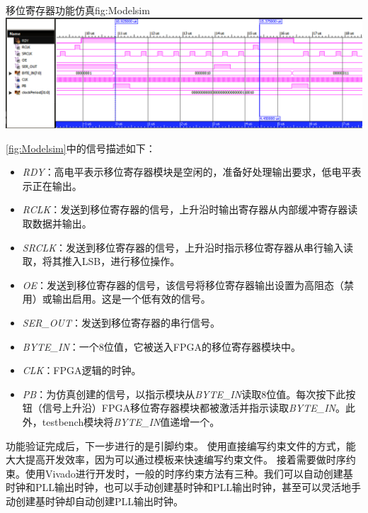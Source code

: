 \documentclass[supercite]{HustGraduPaper}
\begin{document}
\begin{generalfig}[htb]{移位寄存器功能仿真}{fig:Modelsim}
	\includegraphics[width=\linewidth]{Figures/Modelsim.png}
\end{generalfig}	

\autoref{fig:Modelsim}中的信号描述如下：
\begin{itemize}
	\item {\itshape RDY}：高电平表示移位寄存器模块是空闲的，准备好处理输出要求，低电平表示正在输出。
	\item {\itshape RCLK}：发送到移位寄存器的信号，上升沿时输出寄存器从内部缓冲寄存器读取数据并输出。
	\item {\itshape SRCLK}：发送到移位寄存器的信号，上升沿时指示移位寄存器从串行输入读取，将其推入LSB，进行移位操作。
	\item {\itshape OE}：发送到移位寄存器的信号，该信号将移位寄存器输出设置为高阻态（禁用）或输出启用。这是一个低有效的信号。
	\item {\itshape SER\_OUT}：发送到移位寄存器的串行信号。
	\item {\itshape BYTE\_IN}：一个8位值，它被送入FPGA的移位寄存器模块中。
	\item {\itshape CLK}：FPGA逻辑的时钟。
	\item {\itshape PB}：为仿真创建的信号，以指示模块从{\itshape BYTE\_IN}读取8位值。每次按下此按钮（信号上升沿）FPGA移位寄存器模块都被激活并指示读取{\itshape BYTE\_IN}。此外，testbench模块将{\itshape BYTE\_IN}值递增一个。
\end{itemize}

功能验证完成后，下一步进行的是引脚约束。
使用直接编写约束文件的方式，能大大提高开发效率，因为可以通过模板来快速编写约束文件。
接着需要做时序约束。使用Vivado进行开发时，一般的时序约束方法有三种。我们可以自动创建基时钟和PLL输出时钟，也可以手动创建基时钟和PLL输出时钟，甚至可以灵活地手动创建基时钟却自动创建PLL输出时钟。


\end{document}
